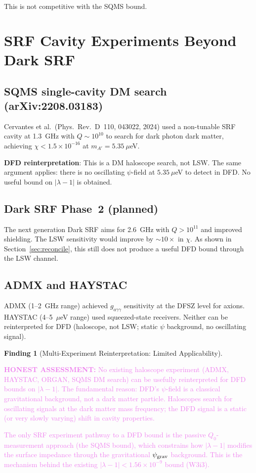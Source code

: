 \documentclass[11pt]{article}
\newcommand{\lbone}{|\lambda - 1|}
\newcommand{\ee}[1]{\times 10^{#1}}
\newcommand{\honest}[1]{\textcolor{violet}{\textbf{HONEST ASSESSMENT:} #1}}
\theoremstyle{definition}
\newtheorem{finding}[theorem]{Finding}
\theoremstyle{remark}
\begin{document}
This is not competitive with the SQMS bound.


\section{SRF Cavity Experiments Beyond Dark SRF}
\label{sec:other_srf}

\subsection{SQMS single-cavity DM search (arXiv:2208.03183)}

Cervantes et al.\ (Phys.\ Rev.\ D~110, 043022, 2024) used a non-tunable
SRF cavity at 1.3~GHz with $Q \sim 10^{10}$ to search for dark photon
dark matter, achieving $\chi < 1.5\ee{-16}$ at $m_{A'} = 5.35~\mu$eV.

\textbf{DFD reinterpretation}: This is a DM haloscope search, not LSW.
The same argument applies: there is no oscillating $\psi$-field at
$5.35~\mu$eV to detect in DFD. No useful bound on $\lbone$ is obtained.

\subsection{Dark SRF Phase~2 (planned)}

The next generation Dark SRF aims for 2.6~GHz with $Q > 10^{11}$ and
improved shielding. The LSW sensitivity would improve by $\sim 10\times$
in $\chi$. As shown in Section~\ref{sec:reconcile}, this still does not
produce a useful DFD bound through the LSW channel.

\subsection{ADMX and HAYSTAC}

ADMX (1--2~GHz range) achieved $g_{a\gamma\gamma}$ sensitivity at the
DFSZ level for axions. HAYSTAC (4--5~$\mu$eV range) used squeezed-state
receivers. Neither can be reinterpreted for DFD (haloscope, not LSW;
static $\psi$ background, no oscillating signal).

\begin{finding}[Multi-Experiment Reinterpretation: Limited Applicability]
\label{find:multi_experiment}
\honest{No existing haloscope experiment (ADMX, HAYSTAC, ORGAN,
SQMS DM search) can be usefully reinterpreted for DFD bounds on
$\lbone$. The fundamental reason: DFD's $\psi$-field is a classical
gravitational background, not a dark matter particle. Haloscopes
search for oscillating signals at the dark matter mass frequency;
the DFD signal is a static (or very slowly varying) shift in cavity
properties.

The only SRF experiment pathway to a DFD bound is the passive
$Q_0$-measurement approach (the SQMS bound), which constrains how
$\lbone$ modifies the surface impedance through the gravitational
$\psi_{\rm grav}$ background. This is the mechanism behind the
existing $\lbone < 1.56\ee{-9}$ bound (W3i3).}
\end{finding}
\end{document}
